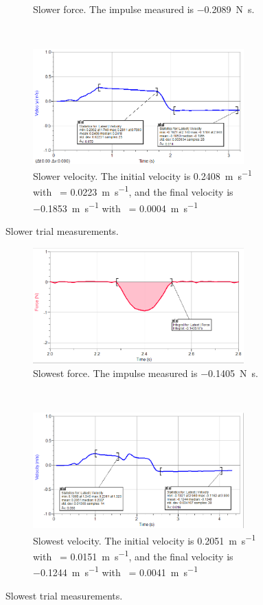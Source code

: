 \documentclass[12pt]{article}
\newcommand{\mps}[1]{\SI{#1}{\meter\per\second}}
\newcommand{\impls}[1]{\SI{#1}{\newton\second}}
\begin{document}
\begin{enumerate}
\begin{figure}[H]
\begin{subfigure}[t]{0.5\textwidth}
                \caption{Slower force. The impulse measured is \impls{-0.2089}.}
            \end{subfigure}%
            ~
            \begin{subfigure}[t]{0.5\textwidth}
                \centering
                \includegraphics[width=3.2in]{slower_velo}
                \caption{Slower velocity. The initial velocity is \mps{0.2408} with \textsigma\ = \mps{0.0223}, and the final velocity is \mps{-.1853} with \textsigma\ = \mps{0.0004}}
            \end{subfigure}
            \caption{Slower trial measurements.}
        \end{figure}
        \begin{figure}[H]
            \begin{subfigure}[t]{0.5\textwidth}
                \centering
                \includegraphics[width=3.2in]{slowest_force}
                \caption{Slowest force. The impulse measured is \impls{-0.1405}.}
            \end{subfigure}%
            ~
            \begin{subfigure}[t]{0.5\textwidth}
                \centering
                \includegraphics[width=3.2in]{slowest_velo}
                \caption{Slowest velocity. The initial velocity is \mps{0.2051} with \textsigma\ = \mps{0.0151}, and the final velocity is \mps{-.1244} with \textsigma\ = \mps{0.0041}}
            \end{subfigure}
            \caption{Slowest trial measurements.}
        \end{figure}
    \end{enumerate}
\end{document}
